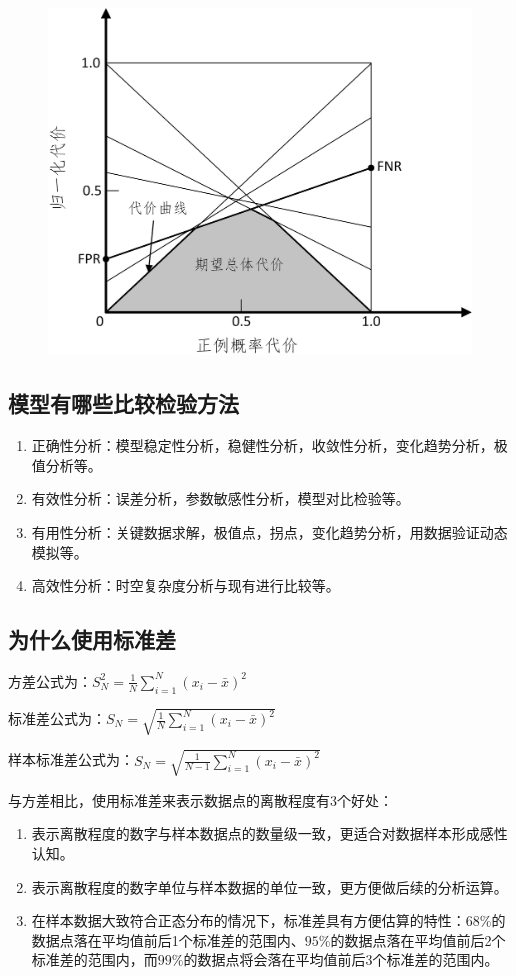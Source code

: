  \begin{figure}[h]
   \centering
   \includegraphics[width=.7\textwidth]{imgs/2.16.18.1.eps}
 \end{figure}

\subsection{模型有哪些比较检验方法}

\begin{enumerate}\itemsep0em 
		\item 正确性分析：模型稳定性分析，稳健性分析，收敛性分析，变化趋势分析，极值分析等。
		\item 有效性分析：误差分析，参数敏感性分析，模型对比检验等。
		\item 有用性分析：关键数据求解，极值点，拐点，变化趋势分析，用数据验证动态模拟等。
		\item 高效性分析：时空复杂度分析与现有进行比较等。
\end{enumerate}


\subsection{为什么使用标准差}


方差公式为：$S^2_{N}=\frac{1}{N}\sum_{i=1}^{N}(x_{i}-\bar{x})^{2}$

标准差公式为：$S_{N}=\sqrt{\frac{1}{N}\sum_{i=1}^{N}(x_{i}-\bar{x})^{2}}$

样本标准差公式为：$S_{N}=\sqrt{\frac{1}{N-1}\sum_{i=1}^{N}(x_{i}-\bar{x})^{2}}$

与方差相比，使用标准差来表示数据点的离散程度有3个好处：

\begin{enumerate}\itemsep0em 
\item 表示离散程度的数字与样本数据点的数量级一致，更适合对数据样本形成感性认知。
\item 表示离散程度的数字单位与样本数据的单位一致，更方便做后续的分析运算。
\item 在样本数据大致符合正态分布的情况下，标准差具有方便估算的特性：$68\%$的数据点落在平均值前后1个标准差的范围内、$95\%$的数据点落在平均值前后2个标准差的范围内，而$99\%$的数据点将会落在平均值前后3个标准差的范围内。
\end{enumerate}

